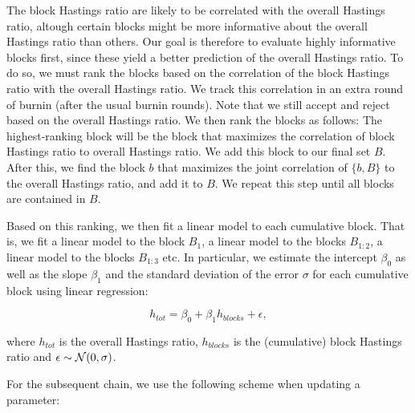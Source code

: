 \documentclass[a4paper,11pt]{article}
\begin{document}
The block Hastings ratio are likely to be correlated with the overall Hastings ratio, altough certain blocks might be more informative about the overall Hastings ratio than others. Our goal is therefore to evaluate highly informative blocks first, since these yield a better prediction of the overall Hastings ratio. To do so, we must rank the blocks based on the correlation of the block Hastings ratio with the overall Hastings ratio. We track this correlation in an extra round of burnin (after the usual burnin rounds). Note that we still accept and reject based on the overall Hastings ratio. We then rank the blocks as follows: The highest-ranking block will be the block that maximizes the correlation of block Hastings ratio to overall Hastings ratio. We add this block to our final set $B$. After this, we find the block $b$ that maximizes the joint correlation of $\{b, B\}$ to the overall Hastings ratio, and add it to $B$. We repeat this step until all blocks are contained in $B$.

Based on this ranking, we then fit a linear model to each cumulative block. That is, we fit a linear model to the block $B_1$, a linear model to the blocks $B_{1:2}$, a linear model to the blocks $B_{1:3}$ etc. In particular, we estimate the intercept $\beta_0$ as well as the slope $\beta_1$ and the standard deviation of the error $\sigma$ for each cumulative block using linear regression:

\begin{equation}\label{eq:linRegBlockLogH}
 h_{tot} = \beta_0 + \beta_1 h_{blocks} + \epsilon,
\end{equation}

where $h_{tot}$ is the overall Hastings ratio, $h_{blocks}$ is the (cumulative) block Hastings ratio and $\epsilon \sim {\cal N}(0, \sigma)$.

For the subsequent chain, we use the following scheme when updating a parameter:
\end{document}
